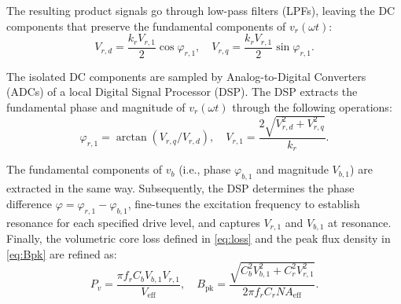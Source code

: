 \documentclass[conference]{IEEEtran}
\begin{document}
The resulting product signals go through low-pass filters (LPFs), leaving the DC components that preserve the fundamental components of $v_r(\omega t)$:
\begin{equation}
V_{r,d} = \frac{k_r V_{r,1}}{2}\cos\varphi_{r,1}, \quad V_{r,q} = \frac{k_r V_{r,1}}{2}\sin\varphi_{r,1}.
\end{equation}

The isolated DC components are sampled by Analog-to-Digital Converters (ADCs) of a local Digital Signal Processor (DSP). The DSP extracts the fundamental phase and magnitude of $v_r(\omega t)$ through the following operations:
\begin{equation}
\varphi_{r,1} = \arctan(V_{r,q}/V_{r,d}), \quad V_{r,1} = \frac{2\sqrt{V_{r,d}^2 + V_{r,q}^2}}{k_r}.
\end{equation}

The fundamental components of $v_{b}$ (i.e., phase $\varphi_{b,1}$ and magnitude $V_{b,1}$) are extracted in the same way. Subsequently, the DSP determines the phase difference $\varphi = \varphi_{r,1} - \varphi_{b,1}$, fine-tunes the excitation frequency to establish resonance for each specified drive level, and captures $V_{r,1}$ and $V_{b,1}$ at resonance. Finally, the volumetric core loss defined in \eqref{eq:loss} and the peak flux density in \eqref{eq:Bpk} are refined as:
\begin{equation}
P_v = \frac{\pi f_r C_b V_{b,1} V_{r,1}}{V_{\text{eff}}}, \quad B_{\text{pk}} = \frac{\sqrt{C_b^2 V_{b,1}^2 + C_r^2 V_{r,1}^2}}{2\pi f_r C_r N A_{\text{eff}}}.
\end{equation}



\end{document}
